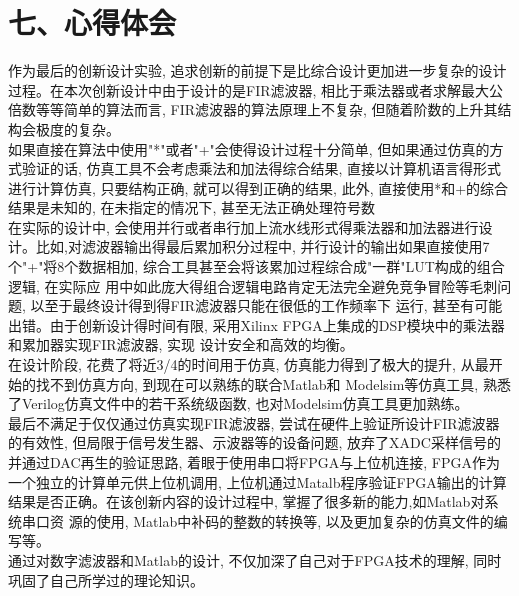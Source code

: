 \documentclass{article}
\newcommand{\fourhao}{\fontsize{14pt}{\baselineskip}\selectfont} %
\newcommand{\xiaosihao}{\fontsize{12pt}{\baselineskip}\selectfont} %
\begin{document}
\section*{\fourhao 七、心得体会}
\xiaosihao
{}
作为最后的创新设计实验, 追求创新的前提下是比综合设计更加进一步复杂的设计过程。在本次创新设计中由于设计的是FIR滤波器,
相比于乘法器或者求解最大公倍数等等简单的算法而言, FIR滤波器的算法原理上不复杂, 但随着阶数的上升其结构会极度的复杂。\\

如果直接在算法中使用"*"或者"+"会使得设计过程十分简单, 但如果通过仿真的方式验证的话, 仿真工具不会考虑乘法和加法得综合结果, 
直接以计算机语言得形式进行计算仿真, 只要结构正确, 就可以得到正确的结果, 此外, 直接使用*和+的综合结果是未知的, 
在未指定的情况下, 甚至无法正确处理符号数\\

在实际的设计中, 会使用并行或者串行加上流水线形式得乘法器和加法器进行设计。比如,对滤波器输出得最后累加积分过程中, 
并行设计的输出如果直接使用7个"+"将8个数据相加, 综合工具甚至会将该累加过程综合成"一群"LUT构成的组合逻辑, 在实际应
用中如此庞大得组合逻辑电路肯定无法完全避免竞争冒险等毛刺问题, 以至于最终设计得到得FIR滤波器只能在很低的工作频率下
运行, 甚至有可能出错。由于创新设计得时间有限, 采用Xilinx FPGA上集成的DSP模块中的乘法器和累加器实现FIR滤波器, 实现
设计安全和高效的均衡。\\

在设计阶段, 花费了将近3/4的时间用于仿真, 仿真能力得到了极大的提升, 从最开始的找不到仿真方向, 到现在可以熟练的联合Matlab和
Modelsim等仿真工具, 熟悉了Verilog仿真文件中的若干系统级函数, 也对Modelsim仿真工具更加熟练。\\

最后不满足于仅仅通过仿真实现FIR滤波器, 尝试在硬件上验证所设计FIR滤波器的有效性, 但局限于信号发生器、示波器等的设备问题, 
放弃了XADC采样信号的并通过DAC再生的验证思路, 着眼于使用串口将FPGA与上位机连接, FPGA作为一个独立的计算单元供上位机调用, 
上位机通过Matalb程序验证FPGA输出的计算结果是否正确。在该创新内容的设计过程中, 掌握了很多新的能力,如Matlab对系统串口资
源的使用, Matlab中补码的整数的转换等, 以及更加复杂的仿真文件的编写等。\\

通过对数字滤波器和Matlab的设计, 不仅加深了自己对于FPGA技术的理解, 同时巩固了自己所学过的理论知识。
\end{document}
